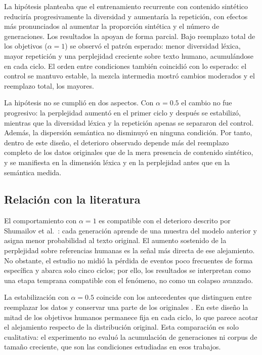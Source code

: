 \documentclass[12pt,letterpaper]{article}
\begin{document}
La hipótesis planteaba que el entrenamiento recurrente con contenido
sintético reduciría progresivamente la diversidad y aumentaría la
repetición, con efectos más pronunciados al aumentar la proporción
sintética y el número de generaciones. Los resultados la apoyan de forma
parcial. Bajo reemplazo total de los objetivos (\(\alpha=1\)) se observó el
patrón esperado: menor diversidad léxica, mayor repetición y una
perplejidad creciente sobre texto humano, acumulándose en cada ciclo.
El orden entre condiciones también coincidió con lo esperado: el control
se mantuvo estable, la mezcla intermedia mostró cambios moderados y el
reemplazo total, los mayores.

La hipótesis no se cumplió en dos aspectos. Con \(\alpha=0.5\) el cambio no
fue progresivo: la perplejidad aumentó en el primer ciclo y después se
estabilizó, mientras que la diversidad léxica y la repetición apenas se
separaron del control. Además, la dispersión semántica no disminuyó en
ninguna condición. Por tanto, dentro de este diseño, el deterioro observado
depende más del reemplazo completo de los datos originales que de la mera
presencia de contenido sintético, y se manifiesta en la dimensión léxica
y en la perplejidad antes que en la semántica medida.

\subsection{Relación con la literatura}

El comportamiento con \(\alpha=1\) es compatible con el deterioro descrito
por Shumailov et al.\ \cite{shumailov2024}: cada generación aprende de una
muestra del modelo anterior y asigna menor probabilidad al texto original.
El aumento sostenido de la perplejidad sobre referencias humanas es la
señal más directa de ese alejamiento. No obstante, el estudio no midió la
pérdida de eventos poco frecuentes de forma específica y abarca solo cinco
ciclos; por ello, los resultados se interpretan como una etapa temprana
compatible con el fenómeno, no como un colapso avanzado.

La estabilización con \(\alpha=0.5\) coincide con los antecedentes que
distinguen entre reemplazar los datos y conservar una parte de los
originales \cite{gerstgrasser2024,kazdan2025}. En este diseño la mitad de
los objetivos humanos permanece fija en cada ciclo, lo que parece acotar
el alejamiento respecto de la distribución original. Esta comparación es
solo cualitativa: el experimento no evaluó la acumulación de generaciones
ni corpus de tamaño creciente, que son las condiciones estudiadas en esos
trabajos.
\end{document}
